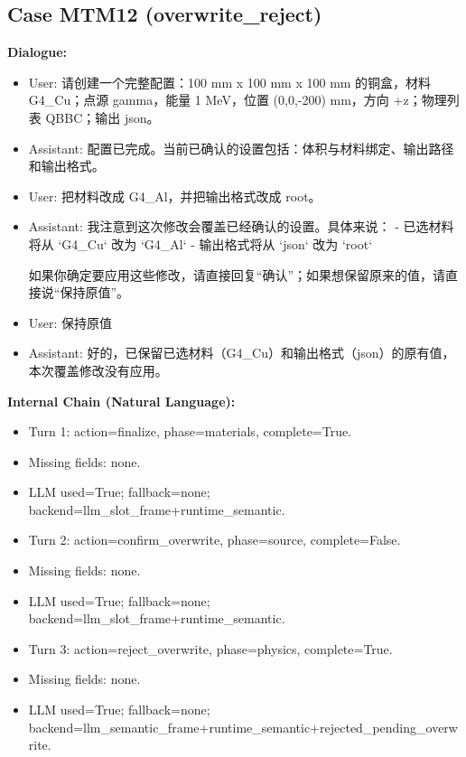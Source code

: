 \documentclass[11pt]{ctexart}
\begin{document}
\subsection{Case MTM12 (overwrite\_reject)}
\textbf{Dialogue:}
\begin{itemize}
\item User: 请创建一个完整配置：100 mm x 100 mm x 100 mm 的铜盒，材料 G4\_Cu；点源 gamma，能量 1 MeV，位置 (0,0,-200) mm，方向 +z；物理列表 QBBC；输出 json。
\item Assistant: 配置已完成。当前已确认的设置包括：体积与材料绑定、输出路径和输出格式。
\item User: 把材料改成 G4\_Al，并把输出格式改成 root。
\item Assistant: 我注意到这次修改会覆盖已经确认的设置。具体来说：  
- 已选材料将从 `G4\_Cu` 改为 `G4\_Al`  
- 输出格式将从 `json` 改为 `root`  

如果你确定要应用这些修改，请直接回复“确认”；如果想保留原来的值，请直接说“保持原值”。
\item User: 保持原值
\item Assistant: 好的，已保留已选材料（G4\_Cu）和输出格式（json）的原有值，本次覆盖修改没有应用。
\end{itemize}
\textbf{Internal Chain (Natural Language):}
\begin{itemize}
\item Turn 1: action=finalize, phase=materials, complete=True.
\item Missing fields: none.
\item LLM used=True; fallback=none; backend=llm\_slot\_frame+runtime\_semantic.
\item Turn 2: action=confirm\_overwrite, phase=source, complete=False.
\item Missing fields: none.
\item LLM used=True; fallback=none; backend=llm\_slot\_frame+runtime\_semantic.
\item Turn 3: action=reject\_overwrite, phase=physics, complete=True.
\item Missing fields: none.
\item LLM used=True; fallback=none; backend=llm\_semantic\_frame+runtime\_semantic+rejected\_pending\_overwrite.
\end{itemize}
\end{document}
